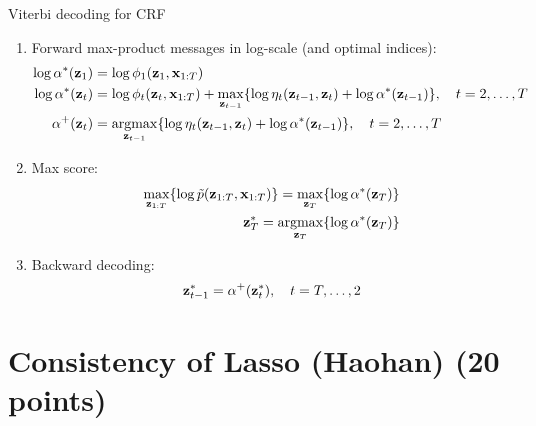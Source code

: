 \documentclass{article}
\begin{document}
\begin{algorithm}[H]
\caption{Viterbi decoding for CRF}
\vspace{1ex}
\begin{enumerate} %
\item 
Forward max-product messages in log-scale (and optimal indices):
\begin{align}
\log \alpha^* (\mathbf{z}_1) 
& = \log \phi_1 (\mathbf{z}_1, \mathbf{x}_{1:T})  \\
\log \alpha^* (\mathbf{z}_t) 
& = \log \phi_t (\mathbf{z}_t, \mathbf{x}_{1:T}) + \max_{\mathbf{z}_{t-1}} \{ \log \eta_t (\mathbf{z}_{t-1}, \mathbf{z}_t) + \log \alpha^* (\mathbf{z}_{t-1}) \} ,  \quad t = 2, \dotsc, T   \\
\alpha^+ (\mathbf{z}_t) 
& = \mathop{\mathrm{argmax}}_{\mathbf{z}_{t-1}} \{ \log \eta_t (\mathbf{z}_{t-1}, \mathbf{z}_t) + \log \alpha^* (\mathbf{z}_{t-1}) \} ,  \quad t = 2, \dotsc, T  
\end{align}



\item 
Max score:
\begin{align}
\max_{\mathbf{z}_{1:T}} \{ \log \tilde{p} (\mathbf{z}_{1:T}, \mathbf{x}_{1:T}) \}
= \max_{\mathbf{z}_T}  & \{ \log \alpha^* (\mathbf{z}_T) \} \\
\mathbf{z}_T^*
= \mathop{\mathrm{argmax}}_{\mathbf{z}_T} & \{ \log \alpha^* (\mathbf{z}_T) \}
\end{align}


\item 
Backward decoding: 
\begin{align}
\mathbf{z}_{t-1}^*
= \alpha^+ (\mathbf{z}_t^*)  , \quad t = T, \dotsc, 2
\end{align}






\end{enumerate}
\end{algorithm}





\newpage
\section{Consistency of Lasso (Haohan) (20 points)}


\newcommand{\xtrain}{X_{\textnormal{train}}}
\newcommand{\ytrain}{y_{\textnormal{train}}}
\newcommand{\xtest}{X_{\textnormal{test}}}
\newcommand{\ytest}{y_{\textnormal{test}}}
\newcommand{\msetrain}{\textnormal{MSE}_{\textnormal{train}}}
\newcommand{\msetest}{\textnormal{MSE}_{\textnormal{test}}}
\end{document}
